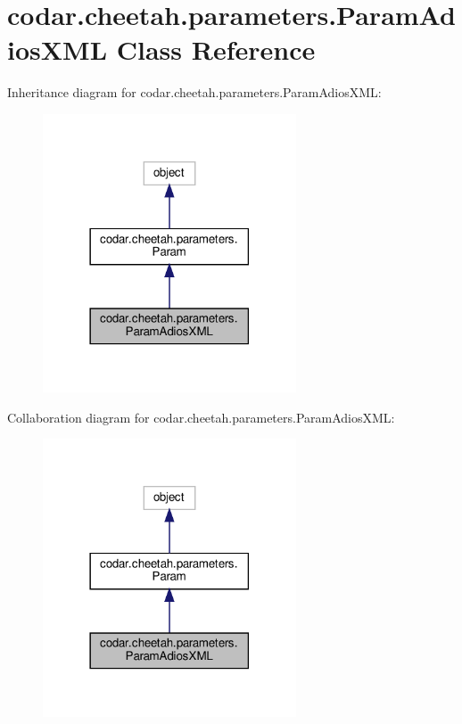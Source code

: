 \hypertarget{classcodar_1_1cheetah_1_1parameters_1_1_param_adios_x_m_l}{}\section{codar.\+cheetah.\+parameters.\+Param\+Adios\+X\+ML Class Reference}
\label{classcodar_1_1cheetah_1_1parameters_1_1_param_adios_x_m_l}


Inheritance diagram for codar.\+cheetah.\+parameters.\+Param\+Adios\+X\+ML\+:
\nopagebreak
\begin{figure}[H]
\begin{center}
\leavevmode
\includegraphics[width=213pt]{classcodar_1_1cheetah_1_1parameters_1_1_param_adios_x_m_l__inherit__graph}
\end{center}
\end{figure}


Collaboration diagram for codar.\+cheetah.\+parameters.\+Param\+Adios\+X\+ML\+:
\nopagebreak
\begin{figure}[H]
\begin{center}
\leavevmode
\includegraphics[width=213pt]{classcodar_1_1cheetah_1_1parameters_1_1_param_adios_x_m_l__coll__graph}
\end{center}
\end{figure}
